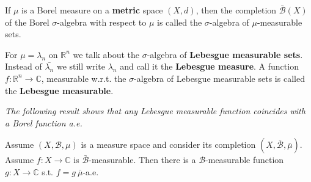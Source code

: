 
\begin{definition}
    If \(\mu\) is a Borel measure on a \textbf{metric} space \((X,d)\), then the completion \(\bar{\mathscr{B}}(X)\) of the Borel \(\sigma\)-algebra
    with respect to \(\mu\) is called the \(\sigma\)-algebra of \(\mu\)-measurable sets. 
\end{definition}
\begin{remark}
    For \(\mu=\lambda_n\) on \(\mathbb{R}^n\) we talk about the \(\sigma\)-algebra of \textbf{Lebesgue measurable sets}. Instead of
    \(\bar{\lambda_n}\) we still write \(\lambda_n\) and call it the \textbf{Lebesgue measure}. A function \(f:\mathbb{R}^n\rightarrow \mathbb{C}\),
    measurable w.r.t. the \(\sigma\)-algebra of Lebesgue measurable sets is called the \textbf{Lebesgue measurable}.
\end{remark}
\emph{The following result shows that any Lebesgue measurable function coincides with a Borel function a.e.}
\begin{proposition}
    Assume \(\left( X,\mathscr{B},\mu \right)\) is a measure space and consider its completion \(\left( X,\bar{\mathscr{B}},\bar{\mu} \right)\).
    Assume \(f:X\rightarrow\mathbb{C}\) is \(\bar{\mathscr{B}}\)-measurable. Then there is a \(\mathscr{B}\)-measurable function 
    \(g:X\rightarrow\mathbb{C}\) s.t. \(f=g \ \bar{\mu}\)-a.e.
\end{proposition}


